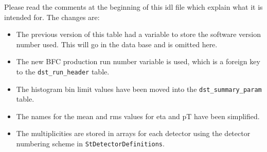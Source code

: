 \vspace{0.1in}
\vspace{0.05in}

Please read the comments at the beginning of this idl file which explain
what it is intended for.  The changes are:

\begin{itemize}
\item
The previous version of this table had a variable to store the software
version number used.  This will go in the data base and is omitted here.
\item
The new BFC production run number variable is used, which is a foreign key
to the {\tt dst\_run\_header} table.
\item
The histogram bin limit values have been moved
into the {\tt dst\_summary\_param}
table.
\item 
The names for the mean and rms values for eta and pT have been simplified.
\item 
The multiplicities are stored in arrays for each detector using the detector
numbering scheme in {\tt StDetectorDefinitions}.
\end{itemize}

